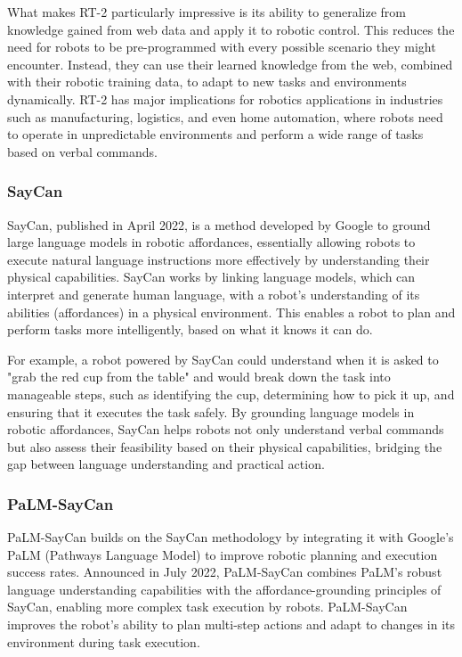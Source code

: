 What makes RT-2 particularly impressive is its ability to generalize from knowledge gained from web data and apply it to robotic control. 
This reduces the need for robots to be pre-programmed with every possible scenario they might encounter. 
Instead, they can use their learned knowledge from the web, combined with their robotic training data, to adapt to new tasks and environments dynamically. 
RT-2 has major implications for robotics applications in industries such as manufacturing, logistics, and even home automation, where robots need to operate in unpredictable environments and perform a wide range of tasks based on verbal commands.

\subsubsection{SayCan}

SayCan, published in April 2022, is a method developed by Google to ground large language models in robotic affordances, essentially allowing robots to execute natural language instructions more effectively by understanding their physical capabilities. 
SayCan works by linking language models, which can interpret and generate human language, with a robot's understanding of its abilities (affordances) in a physical environment. 
This enables a robot to plan and perform tasks more intelligently, based on what it knows it can do.

For example, a robot powered by SayCan could understand when it is asked to "grab the red cup from the table" and would break down the task into manageable steps, such as identifying the cup, determining how to pick it up, and ensuring that it executes the task safely. 
By grounding language models in robotic affordances, SayCan helps robots not only understand verbal commands but also assess their feasibility based on their physical capabilities, bridging the gap between language understanding and practical action.

\subsubsection{PaLM-SayCan}

PaLM-SayCan builds on the SayCan methodology by integrating it with Google’s PaLM (Pathways Language Model) to improve robotic planning and execution success rates. 
Announced in July 2022, PaLM-SayCan combines PaLM's robust language understanding capabilities with the affordance-grounding principles of SayCan, enabling more complex task execution by robots. 
PaLM-SayCan improves the robot’s ability to plan multi-step actions and adapt to changes in its environment during task execution.

